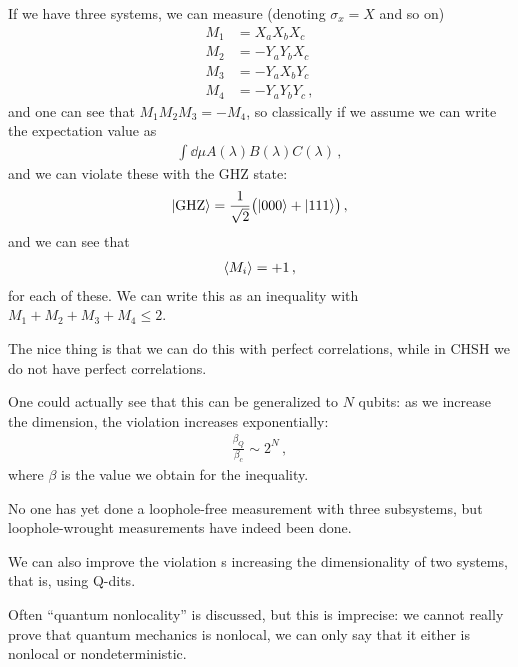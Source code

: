 \documentclass[main.tex]{subfiles}
\begin{document}
If we have three systems, we can measure (denoting \(\sigma_{x} = X\) and so on)
%
\begin{align}
M_1 &= X_{a} X_{b} X_{c} \\
M_2 &= - Y_{a} Y_{b} X_{c} \\
M_3 &= - Y_{a} X_{b} Y_{c} \\
M_4 &= - Y_{a} Y_{b} Y_{c}
\,,
\end{align}
%
and one can see that \(M_1 M_2 M_3 = - M_4 \), so classically if we assume we can write the expectation value as 
%
\begin{align}
\int \dd{\mu } A(\lambda ) B(\lambda ) C(\lambda )
\,,
\end{align}
%
and we can violate these with the GHZ state: 
%
\begin{align}
\ket{\text{GHZ}} = \frac{1}{\sqrt{2}} \qty(\ket{000} + \ket{111})
\,,
\end{align}
%
and we can see that 
%
\begin{align}
\expval{M_i} = +1
\,,
\end{align}
%
for each of these. We can write this as an inequality with \(M_1 + M_2 + M_3 + M_4 \leq 2\). 

The nice thing is that we can do this with perfect correlations, while in CHSH we do not have perfect correlations. 

One could actually see that this can be generalized to \(N\) qubits: as we increase the dimension, the violation increases exponentially: 
%
\begin{align}
\frac{\beta_{Q}}{\beta_{c}} \sim 2^{N}
\,,
\end{align}
%
where \(\beta \) is the value we obtain for the inequality. 

No one has yet done a loophole-free measurement with three subsystems, but loophole-wrought measurements have indeed been done. 

We can also improve the violation s increasing the dimensionality of two systems, that is, using Q-dits.

Often ``quantum nonlocality'' is discussed, but this is imprecise: we cannot really prove that quantum mechanics is nonlocal, we can only say that it either is  nonlocal or nondeterministic. 
\end{document}
